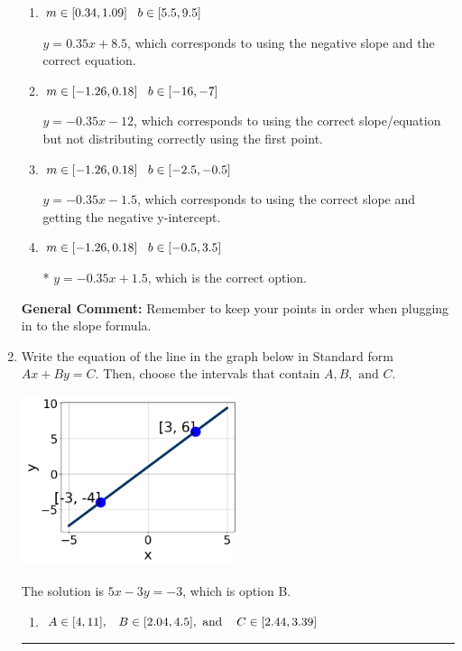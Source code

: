 \documentclass{extbook}[14pt]
\newcommand{\litem}[1]{\item #1

\rule{\textwidth}{0.4pt}}
\begin{document}
\begin{enumerate}
{\begin{enumerate}[label=\Alph*.]
 $y = -0.35x + 15$, which corresponds to using the correct slope/equation but not distributing correctly using the second point.
\item \( m \in [0.34, 1.09] \hspace*{3mm} b \in [5.5, 9.5] \)

 $y = 0.35x + 8.5$, which corresponds to using the negative slope and the correct equation.
\item \( m \in [-1.26, 0.18] \hspace*{3mm} b \in [-16, -7] \)

 $y = -0.35x -12$, which corresponds to using the correct slope/equation but not distributing correctly using the first point.
\item \( m \in [-1.26, 0.18] \hspace*{3mm} b \in [-2.5, -0.5] \)

 $y = -0.35x -1.5$, which corresponds to using the correct slope and getting the negative y-intercept.
\item \( m \in [-1.26, 0.18] \hspace*{3mm} b \in [-0.5, 3.5] \)

* $y = -0.35x + 1.5$, which is the correct option.
\end{enumerate}

\textbf{General Comment:} Remember to keep your points in order when plugging in to the slope formula.
}
\litem{
Write the equation of the line in the graph below in Standard form $Ax+By=C$. Then, choose the intervals that contain $A, B, \text{ and } C$.

\begin{center}
    \includegraphics[width=0.5\textwidth]{../Figures/linearGraphToStandardA.png}
\end{center}




The solution is \( 5x - 3y = -3 \), which is option B.\begin{enumerate}[label=\Alph*.]
\item \( A \in [4, 11], \hspace{3mm} B \in [2.04, 4.5], \text{ and } \hspace{3mm} C \in [2.44, 3.39] \)


\end{enumerate}}
\end{enumerate}
\end{document}
